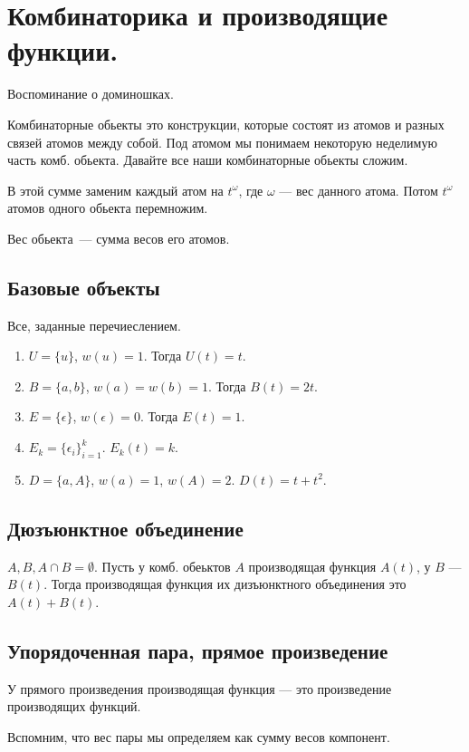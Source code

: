 \section{Комбинаторика и производящие функции.}

Воспоминание о доминошках.

Комбинаторные обьекты это конструкции, которые состоят из атомов и разных связей атомов между собой. 
Под атомом мы понимаем некоторую неделимую часть комб. обьекта.
Давайте все наши комбинаторные обьекты сложим.

В этой сумме заменим каждый атом на $t^{\omega}$, где $\omega$ --- вес данного атома.
Потом $t^\omega$ атомов одного обьекта перемножим. 

Вес обьекта~--- сумма весов его атомов. 

\subsection*{Базовые объекты}
    Все, заданные перечиеслением. 
    \begin{enumerate}
        \item $U = \{u\}$, $w(u) = 1$. 
        Тогда $U(t) = t$.
        \item $B = \{ a,b\}$, $w(a) = w(b) = 1$.
        Тогда $B(t) = 2t$.
        \item $E = \{\epsilon\}$, $w(\epsilon) = 0$. 
        Тогда $E(t) = 1$.
        \item $E_k = \{ \epsilon_i\}_{i=1}^k$. $E_k(t) = k$.
        \item $D= \{a,A\}$, $w(a) = 1$, $w(A) = 2$. $D(t) = t + t^2$. 
    \end{enumerate}

\subsection*{Дюзъюнктное объединение}
$A, B, A\cap B = \emptyset$.
Пусть у комб. обеьктов $A$ производящая функция $A(t)$, у $B$ --- $B(t)$.
Тогда производящая функция их дизъюнктного объединения это $A(t)+B(t)$.

\subsection*{Упорядоченная пара, прямое произведение}
У прямого произведения производящая функция --- это произведение производящих функций.

Вспомним, что вес пары мы определяем как сумму весов компонент.

